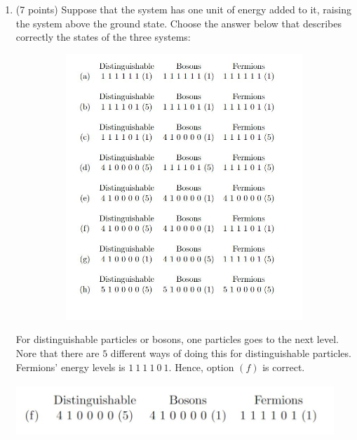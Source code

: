 \documentclass[fleqn]{article}
\begin{document}
\begin{enumerate}
    \pagebreak

    \item (7 points) Suppose that the system has one unit of energy added to it, raising the system above
    the ground state. Choose the answer below that describes correctly the states of the three
    systems:
    \begin{center}
      \includegraphics[height=10cm, width=15cm]{2.JPG}
    \end{center}

      \textcolor{hwColor}{
        For distinguishable particles or bosons, one particles goes to the next level. Nore that there are $5$ different ways of doing this for distinguishable particles.
        Fermions' energy levels is $1 ~ 1 ~ 1 ~ 1 ~ 0 ~ 1$. Hence, option $(f)$ is correct.
      }
      \begin{center}
        \includegraphics[height=2cm, width=12cm]{Answer2.JPG}
      \end{center}

    \pagebreak


\end{enumerate}
\end{document}
